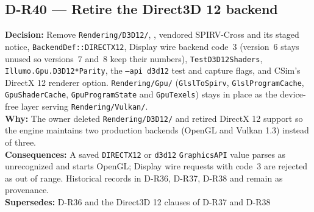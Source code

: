 \subsection*{D-R40 --- Retire the Direct3D 12 backend}
\begin{decisionbox}[title={D-R40 \quad 2026-11-05}]
\textbf{Decision:} Remove \texttt{Rendering/D3D12/},
, vendored SPIRV-Cross and its
staged notice, \texttt{BackendDef::DIRECTX12}, Display wire backend code~3
(version~6 stays unused so versions~7 and~8 keep their numbers),
\texttt{TestD3D12Shaders}, \texttt{Illumo.Gpu.D3D12*Parity}, the
\texttt{--api d3d12} test and capture flags, and CSim's DirectX 12 renderer
option. \texttt{Rendering/Gpu/} (\texttt{GlslToSpirv},
\texttt{GlslProgramCache}, \texttt{GpuShaderCache}, \texttt{GpuProgramState}
and \texttt{GpuTexels}) stays in place as the device-free layer serving
\texttt{Rendering/Vulkan/}.\\
\textbf{Why:} The owner deleted \texttt{Rendering/D3D12/} and retired DirectX
12 support so the engine maintains two production backends (OpenGL and Vulkan
1.3) instead of three.\\
\textbf{Consequences:} A saved \texttt{DIRECTX12} or \texttt{d3d12}
\texttt{GraphicsAPI} value parses as unrecognized and starts OpenGL; Display
wire requests with code~3 are rejected as out of range. Historical records in
D-R36, D-R37, D-R38 and  remain as
provenance.\\
\textbf{Supersedes:} D-R36 and the Direct3D 12 clauses of D-R37 and D-R38
\end{decisionbox}

